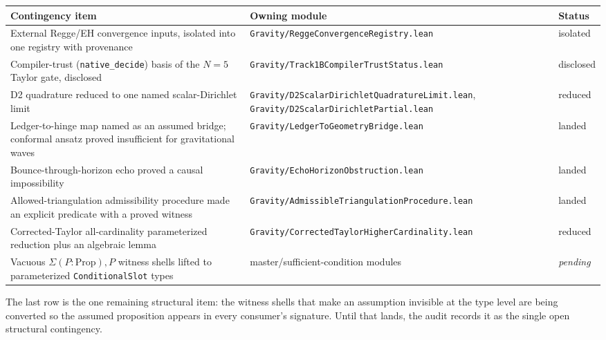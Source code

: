 \documentclass[11pt,letterpaper]{article}
\theoremstyle{definition}
\begin{document}
\begin{center}
\footnotesize
\renewcommand{\arraystretch}{1.2}
\begin{tabular}{p{4.5cm}p{4.6cm}l}
\toprule
\textbf{Contingency item} & \textbf{Owning module} & \textbf{Status} \\
\midrule
External Regge/EH convergence inputs, isolated into one registry with
provenance & \texttt{Gravity/ReggeConvergenceRegistry.lean}
& isolated \\
Compiler-trust (\texttt{native\_decide}) basis of the $N{=}5$ Taylor
gate, disclosed & \texttt{Gravity/Track1BCompilerTrustStatus.lean}
& disclosed \\
D2 quadrature reduced to one named scalar-Dirichlet limit
& \texttt{Gravity/D2ScalarDirichletQuadratureLimit.lean},
\texttt{Gravity/D2ScalarDirichletPartial.lean} & reduced \\
Ledger-to-hinge map named as an assumed bridge; conformal ansatz proved
insufficient for gravitational waves
& \texttt{Gravity/LedgerToGeometryBridge.lean} & landed \\
Bounce-through-horizon echo proved a causal impossibility
& \texttt{Gravity/EchoHorizonObstruction.lean} & landed \\
Allowed-triangulation admissibility procedure made an explicit predicate
with a proved witness & \texttt{Gravity/AdmissibleTriangulationProcedure.lean}
& landed \\
Corrected-Taylor all-cardinality parameterized reduction plus an
algebraic lemma & \texttt{Gravity/CorrectedTaylorHigherCardinality.lean}
& reduced \\
Vacuous $\Sigma(P{:}\mathrm{Prop}),P$ witness shells lifted to
parameterized \texttt{ConditionalSlot} types & master/sufficient-condition
modules & \emph{pending} \\
\bottomrule
\end{tabular}
\end{center}

The last row is the one remaining structural item: the witness shells
that make an assumption invisible at the type level are being converted
so the assumed proposition appears in every consumer's signature.  Until
that lands, the audit records it as the single open structural
contingency.
\end{document}

